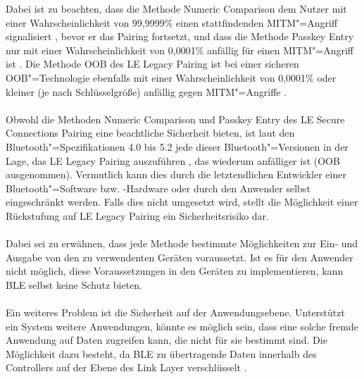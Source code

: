 Dabei ist zu beachten, dass die Methode Numeric Comparison dem Nutzer mit einer Wahrscheinlichkeit von 99,9999\% einen stattfindenden MITM"=Angriff signalisiert \cite{BtSpec4.2_2309}, bevor er das Pairing fortsetzt, und dass die Methode Passkey Entry nur mit einer Wahrscheinlichkeit von 0,0001\% anfällig für einen MITM"=Angriff ist \cite{BtSpec4.2_2304} \cite{BtSpec4.2_2311}. Die Methode OOB des LE Legacy Pairing ist bei einer sicheren OOB"=Technologie ebenfalls mit einer Wahrscheinlichkeit von 0,0001\% oder kleiner (je nach Schlüsselgröße) anfällig gegen MITM"=Angriffe \cite{BtSpec4.2_2305}.
\\\\
Obwohl die Methoden Numeric Comparison und Passkey Entry des LE Secure Connections Pairing eine beachtliche Sicherheit bieten, ist laut den Bluetooth"=Spezifikationen 4.0 bis 5.2 jede dieser Bluetooth"=Versionen in der Lage, das LE Legacy Pairing auszuführen \cite{BtSpec4.2_248_b} \cite{BtSpec5.2_277}, das wiederum anfälliger ist (OOB ausgenommen). 
Vermutlich kann dies durch die letztendlichen Entwickler einer Bluetooth"=Software bzw. -Hardware oder durch den Anwender selbst eingeschränkt werden. Falls dies nicht umgesetzt wird, stellt die Möglichkeit einer Rückstufung auf LE Legacy Pairing ein Sicherheitsrisiko dar.
\\\\
Dabei sei zu erwähnen, dass jede Methode bestimmte Möglichkeiten zur Ein- und Ausgabe von den zu verwendenten Geräten voraussetzt. Ist es für den Anwender nicht möglich, diese Voraussetzungen in den Geräten zu implementieren, kann BLE selbst keine Schutz bieten.
\\\\
Ein weiteres Problem ist die Sicherheit auf der Anwendungsebene. Unterstützt ein System weitere Anwendungen, könnte es möglich sein, dass eine solche fremde Anwendung auf Daten zugreifen kann, die nicht für sie bestimmt sind. Die Möglichkeit dazu besteht, da BLE zu übertragende Daten innerhalb des Controllers auf der Ebene des Link Layer verschlüsselt \cite{BtSpec4.0_196} \cite{BtSpec4.0_2285}. 

